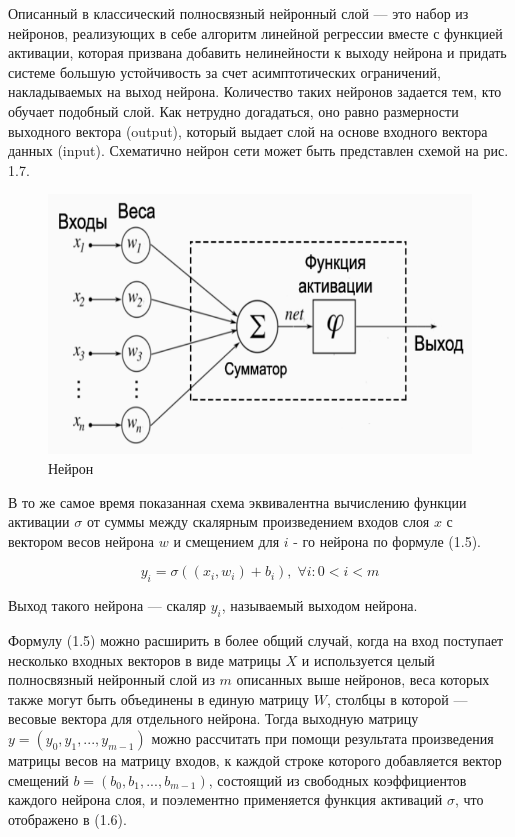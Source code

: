 Описанный в \cite{rnn} классический полносвязный нейронный слой — это набор из нейронов, реализующих в себе алгоритм линейной регрессии вместе с функцией активации, которая призвана добавить нелинейности к выходу нейрона и придать системе большую устойчивость за счет асимптотических ограничений, накладываемых на выход нейрона. Количество таких нейронов задается тем, кто обучает подобный слой. Как нетрудно догадаться, оно равно размерности выходного вектора (output), который выдает слой на основе входного вектора данных (input). Схематично нейрон сети может быть представлен схемой на рис. 1.7.

\begin{figure}[H]
    \begin{center}
        \includegraphics[scale=0.3]{tex/inc/img/neron.jpg}
        \caption{Нейрон}
    \end{center}
\end{figure}

В то же самое время показанная схема эквивалентна вычислению функции активации $\sigma$ от суммы между скалярным произведением входов слоя $x$ с вектором весов нейрона $w$ и смещением для $i$ - го нейрона по формуле (1.5).

\begin{equation}
y_i = \sigma((x_i, w_i) + b_i), \; \forall i: 0 < i < m
\end{equation}

Выход такого нейрона — скаляр $y_i$, называемый выходом нейрона.

Формулу (1.5) можно расширить в более общий случай, когда на вход поступает несколько входных векторов в виде матрицы $X$ и используется целый полносвязный нейронный слой из $m$ описанных выше нейронов, веса которых также могут быть объединены в единую матрицу $W$, столбцы в которой — весовые вектора для отдельного нейрона. Тогда выходную матрицу $y = (y_0, y_1, ..., y_{m - 1})$ можно рассчитать при помощи результата произведения матрицы весов на матрицу входов, к каждой строке которого добавляется вектор смещений $b = (b_0, b_1, ..., b_{m-1})$, состоящий из свободных коэффициентов каждого нейрона слоя, и поэлементно применяется функция активаций $\sigma$, что отображено в (1.6).

